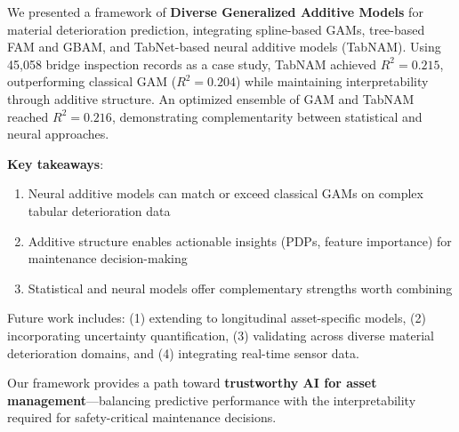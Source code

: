 \documentclass[twocolumn]{article}
\begin{document}
We presented a framework of \textbf{Diverse Generalized Additive Models} for material deterioration prediction, integrating spline-based GAMs, tree-based FAM and GBAM, and TabNet-based neural additive models (TabNAM). Using 45,058 bridge inspection records as a case study, TabNAM achieved $R^2=0.215$, outperforming classical GAM ($R^2=0.204$) while maintaining interpretability through additive structure. An optimized ensemble of GAM and TabNAM reached $R^2=0.216$, demonstrating complementarity between statistical and neural approaches.

\textbf{Key takeaways}:
\begin{enumerate}
\item Neural additive models can match or exceed classical GAMs on complex tabular deterioration data
\item Additive structure enables actionable insights (PDPs, feature importance) for maintenance decision-making
\item Statistical and neural models offer complementary strengths worth combining
\end{enumerate}

Future work includes: (1) extending to longitudinal asset-specific models, (2) incorporating uncertainty quantification, (3) validating across diverse material deterioration domains, and (4) integrating real-time sensor data.

Our framework provides a path toward \textbf{trustworthy AI for asset management}—balancing predictive performance with the interpretability required for safety-critical maintenance decisions.
\end{document}
